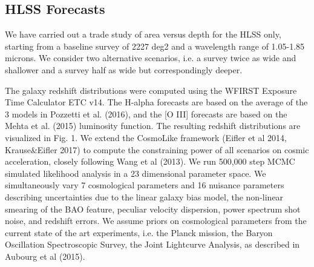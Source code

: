    
\subsection{HLSS Forecasts}
We have carried out a trade study of area versus depth for the HLSS only, starting from a baseline survey of 2227 deg2 and a wavelength range of 1.05-1.85 microns. We consider two alternative scenarios, i.e. a survey twice as wide and shallower and a survey half as wide but correspondingly deeper.  

The galaxy redshift distributions were computed using the WFIRST Exposure Time Calculator ETC v14. The H-alpha forecasts are based on the average of the 3 models in Pozzetti et al. (2016), and the [O III] forecasts are based on the Mehta et al. (2015) luminosity function. The resulting redshift distributions are visualized in Fig. 1.
We extend the CosmoLike framework (Eifler et al 2014, Krause\&Eifler 2017) to compute the constraining power of all scenarios on cosmic acceleration, closely following Wang et al (2013). We run 500,000 step MCMC simulated likelihood analysis in a 23 dimensional parameter space. We simultaneously vary 7 cosmological parameters and 16 nuisance parameters describing uncertainties due to the linear galaxy bias model, the non-linear smearing of the BAO feature, peculiar velocity dispersion, power spectrum shot noise, and redshift errors. We assume priors on cosmological parameters from the current state of the art experiments, i.e. the Planck mission, the Baryon Oscillation Spectroscopic Survey, the Joint Lightcurve Analysis, as described in Aubourg et al (2015). 


